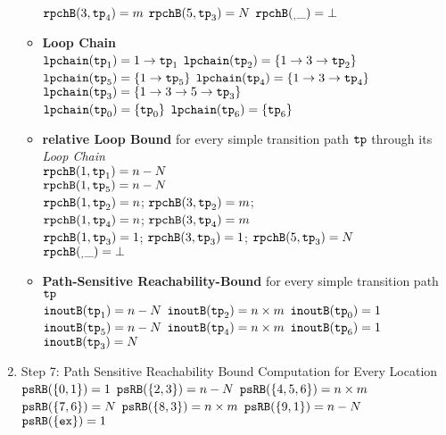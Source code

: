 \begin{enumerate}
\begin{itemize}
  $\mathtt{rpchB}(3, \mathtt{tp}_4) = m$ \quad
  $\mathtt{rpchB}(5, \mathtt{tp}_3) = N$ \quad \quad 
  $\mathtt{rpchB}(_, \_) = \bot $ 
  \item \textbf{Loop Chain}
  \\
  $\mathtt{lpchain}(\mathtt{tp}_1) = 1\to \mathtt{tp}_1$ \quad
  $\mathtt{lpchain}(\mathtt{tp}_2) = \{1 \to 3 \to \mathtt{tp}_2\}$ \\
  $\mathtt{lpchain}(\mathtt{tp}_5) = \{1\to \mathtt{tp}_5\}$ \quad
  $\mathtt{lpchain}(\mathtt{tp}_4) = \{1 \to 3 \to \mathtt{tp}_4\}$ \\
  $\mathtt{lpchain}(\mathtt{tp}_3) = \{1 \to 3 \to 5 \to \mathtt{tp}_3\}$ \\
  $\mathtt{lpchain}(\mathtt{tp}_0) = \{\mathtt{tp}_0\}$ \quad
  $\mathtt{lpchain}(\mathtt{tp}_6) = \{\mathtt{tp}_6\}$ 
  \item \textbf{{relative Loop Bound}} for every simple transition path $\mathtt{tp}$ through its \emph{Loop Chain}
  \\
  $\mathtt{rpchB}(1, \mathtt{tp}_1) = n - N$ \\
  $\mathtt{rpchB}(1, \mathtt{tp}_5) = n - N$ \\
  $\mathtt{rpchB}(1, \mathtt{tp}_2) = n$;  $\mathtt{rpchB}(3, \mathtt{tp}_2) = m$; \\
  $\mathtt{rpchB}(1, \mathtt{tp}_4) = n$; $\mathtt{rpchB}(3, \mathtt{tp}_4) = m$ \\
  $\mathtt{rpchB}(1, \mathtt{tp}_3) = 1$; $\mathtt{rpchB}(3, \mathtt{tp}_3) = 1$; $\mathtt{rpchB}(5, \mathtt{tp}_3) = N$ \\
  $\mathtt{rpchB}(_, \_) = \bot $ 
  \item \textbf{Path-Sensitive Reachability-Bound} for every simple transition path $\mathtt{tp}$
  \\
  $\mathtt{inoutB}(\mathtt{tp}_1) = n - N$ \quad
  $\mathtt{inoutB}(\mathtt{tp}_2) = n \times m$ \quad
  $\mathtt{inoutB}(\mathtt{tp}_0) = 1$ 
  \\
  $\mathtt{inoutB}(\mathtt{tp}_5) = n - N$ \quad
  $\mathtt{inoutB}(\mathtt{tp}_4) = n \times m$ \quad
  $\mathtt{inoutB}(\mathtt{tp}_6) = 1$ 
  \\
  $\mathtt{inoutB}(\mathtt{tp}_3) = N$ \quad
\end{itemize}
\item Step 7: Path Sensitive Reachability Bound Computation for Every Location
\\
$\mathtt{psRB}(\{0, 1\}) = 1$ \quad
$\mathtt{psRB}(\{2, 3\}) = n - N$ \quad
$\mathtt{psRB}(\{4, 5, 6\}) = n \times m$ \\
$\mathtt{psRB}(\{7, 6\}) = N$ \quad
$\mathtt{psRB}(\{8, 3\}) = n \times m$ \quad
$\mathtt{psRB}(\{9, 1\}) = n - N$ \\
$\mathtt{psRB}(\{\mathtt{ex}\}) = 1$ 
\end{enumerate}